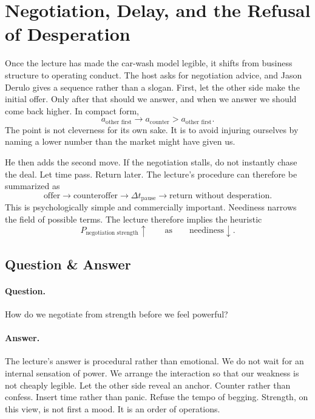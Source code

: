 \section{Negotiation, Delay, and the Refusal of Desperation}

Once the lecture has made the car-wash model legible, it shifts from business structure to operating conduct. The host asks for negotiation advice, and Jason Derulo gives a sequence rather than a slogan. First, let the other side make the initial offer. Only after that should we answer, and when we answer we should come back higher. In compact form,
\begin{equation}
a_{\text{other first}}
\to
a_{\text{counter}} > a_{\text{other first}}.
\end{equation}
The point is not cleverness for its own sake. It is to avoid injuring ourselves by naming a lower number than the market might have given us.

He then adds the second move. If the negotiation stalls, do not instantly chase the deal. Let time pass. Return later. The lecture's procedure can therefore be summarized as
\begin{equation}
\text{offer}\to \text{counteroffer}\to \Delta t_{\text{pause}}\to \text{return without desperation}.
\end{equation}
This is psychologically simple and commercially important. Neediness narrows the field of possible terms. The lecture therefore implies the heuristic
\begin{equation}
P_{\text{negotiation strength}}\uparrow
\qquad\text{as}\qquad
\text{neediness}\downarrow.
\end{equation}

\subsection{Question \& Answer}

\paragraph{Question.}
How do we negotiate from strength before we feel powerful?

\paragraph{Answer.}
The lecture's answer is procedural rather than emotional. We do not wait for an internal sensation of power. We arrange the interaction so that our weakness is not cheaply legible. Let the other side reveal an anchor. Counter rather than confess. Insert time rather than panic. Refuse the tempo of begging. Strength, on this view, is not first a mood. It is an order of operations.

